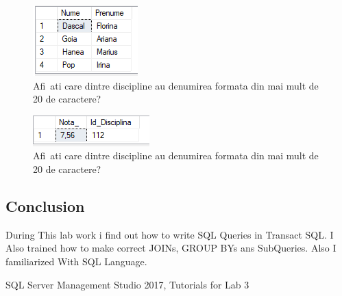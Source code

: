 \documentclass[12pt]{article}
\begin{document}
        \begin{figure}[H]
                \centering
                \includegraphics[width=.95\textwidth]{img26.png}
                \caption{Afi~ati care dintre discipline au denumirea formata din mai mult de 20 de caractere? }
        \end{figure}
        \vspace{0.5 cm}

        \begin{figure}[H]
                \centering
                \includegraphics[width=.95\textwidth]{img37.png}
                \caption{Afi~ati care dintre discipline au denumirea formata din mai mult de 20 de caractere? }
        \end{figure}
        \vspace{0.5 cm}

        \newpage 
        \subsection*{Conclusion}
        During This lab work i find out how to write SQL Queries in Transact SQL. I Also trained how to make correct JOINs, GROUP BYs ans SubQueries. Also I familiarized With SQL Language.
        \cite{SQLServerManagementStudio}
        

 
\medskip
 
\begin{thebibliography}{9}
SQL Server Management Studio 2017, Tutorials for Lab 3

\end{thebibliography}
                
\end{document}
